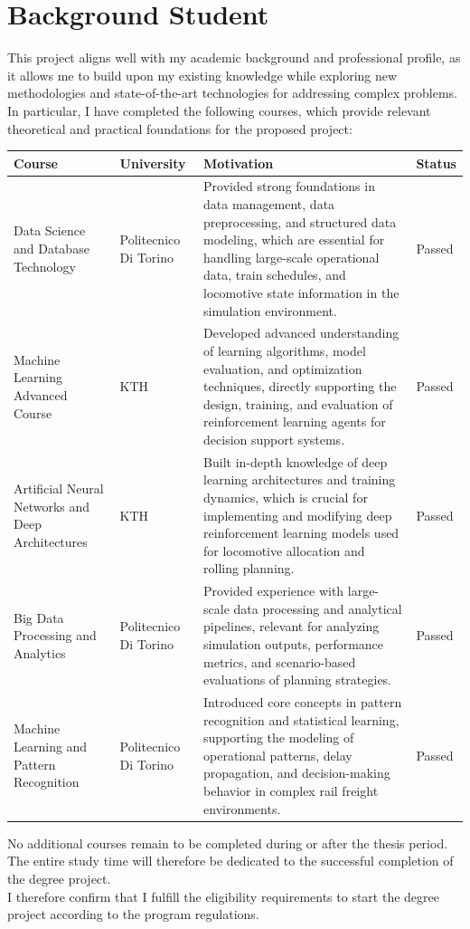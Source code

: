 \documentclass[a4paper]{scrartcl}
\begin{document}
\section{Background Student}
This project aligns well with my academic background and professional profile, as it allows me to build upon my existing knowledge while exploring new methodologies and state-of-the-art technologies for addressing complex problems.
In particular, I have completed the following courses, which provide relevant theoretical and practical foundations for the proposed project:
\begin{table}[H]
\centering
\begin{tabular}{|p{4.2cm}|p{2cm}|p{6.5cm}|p{2cm}|}
\hline
\textbf{Course} & \textbf{University} & \textbf{Motivation} & \textbf{Status} \\
\hline
Data Science and Database Technology & Politecnico Di Torino & 
Provided strong foundations in data management, data preprocessing, and structured data modeling, which are essential for handling large-scale operational data, train schedules, and locomotive state information in the simulation environment. & Passed \\
\hline
Machine Learning Advanced Course & KTH & 
Developed advanced understanding of learning algorithms, model evaluation, and optimization techniques, directly supporting the design, training, and evaluation of reinforcement learning agents for decision support systems. & Passed \\
\hline
Artificial Neural Networks and Deep Architectures & KTH & 
Built in-depth knowledge of deep learning architectures and training dynamics, which is crucial for implementing and modifying deep reinforcement learning models used for locomotive allocation and rolling planning. & Passed \\
\hline
Big Data Processing and Analytics & Politecnico Di Torino & 
Provided experience with large-scale data processing and analytical pipelines, relevant for analyzing simulation outputs, performance metrics, and scenario-based evaluations of planning strategies. & Passed \\
\hline
Machine Learning and Pattern Recognition & Politecnico Di Torino & 
Introduced core concepts in pattern recognition and statistical learning, supporting the modeling of operational patterns, delay propagation, and decision-making behavior in complex rail freight environments. & Passed \\
\hline
\end{tabular}
\end{table}
No additional courses remain to be completed during or after the thesis period. The entire study time will therefore be dedicated to the successful completion of the degree project.\\
I therefore confirm that I fulfill the eligibility requirements to start the degree project according to the program regulations.
\end{document}
